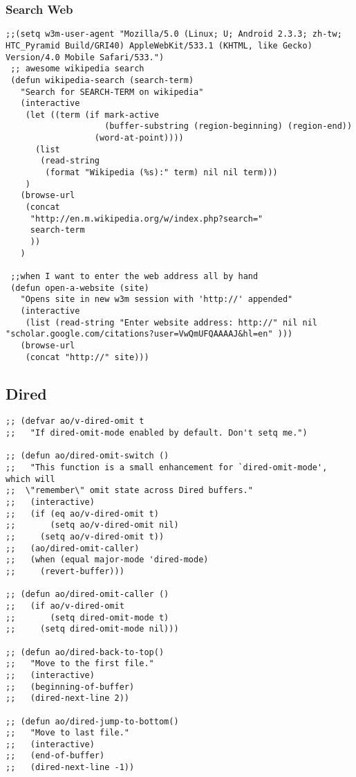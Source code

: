 \documentclass[11pt]{article}
\begin{document}
\subsubsection{Search Web}
\label{sec:orgheadline27}
\begin{verbatim}
;;(setq w3m-user-agent "Mozilla/5.0 (Linux; U; Android 2.3.3; zh-tw; HTC_Pyramid Build/GRI40) AppleWebKit/533.1 (KHTML, like Gecko) Version/4.0 Mobile Safari/533.")
 ;; awesome wikipedia search
 (defun wikipedia-search (search-term)
   "Search for SEARCH-TERM on wikipedia"
   (interactive
    (let ((term (if mark-active
                    (buffer-substring (region-beginning) (region-end))
                  (word-at-point))))
      (list
       (read-string
        (format "Wikipedia (%s):" term) nil nil term)))
    )
   (browse-url
    (concat
     "http://en.m.wikipedia.org/w/index.php?search="
     search-term
     ))
   )

 ;;when I want to enter the web address all by hand
 (defun open-a-website (site)
   "Opens site in new w3m session with 'http://' appended"
   (interactive
    (list (read-string "Enter website address: http://" nil nil "scholar.google.com/citations?user=VwQmUFQAAAAJ&hl=en" )))
   (browse-url
    (concat "http://" site)))
\end{verbatim}
\subsection{Dired}
\label{sec:orgheadline29}
\begin{verbatim}
;; (defvar ao/v-dired-omit t
;;   "If dired-omit-mode enabled by default. Don't setq me.")

;; (defun ao/dired-omit-switch ()
;;   "This function is a small enhancement for `dired-omit-mode', which will
;;  \"remember\" omit state across Dired buffers."
;;   (interactive)
;;   (if (eq ao/v-dired-omit t)
;;       (setq ao/v-dired-omit nil)
;;     (setq ao/v-dired-omit t))
;;   (ao/dired-omit-caller)
;;   (when (equal major-mode 'dired-mode)
;;     (revert-buffer)))

;; (defun ao/dired-omit-caller ()
;;   (if ao/v-dired-omit
;;       (setq dired-omit-mode t)
;;     (setq dired-omit-mode nil)))

;; (defun ao/dired-back-to-top()
;;   "Move to the first file."
;;   (interactive)
;;   (beginning-of-buffer)
;;   (dired-next-line 2))

;; (defun ao/dired-jump-to-bottom()
;;   "Move to last file."
;;   (interactive)
;;   (end-of-buffer)
;;   (dired-next-line -1))
\end{verbatim}
\end{document}
